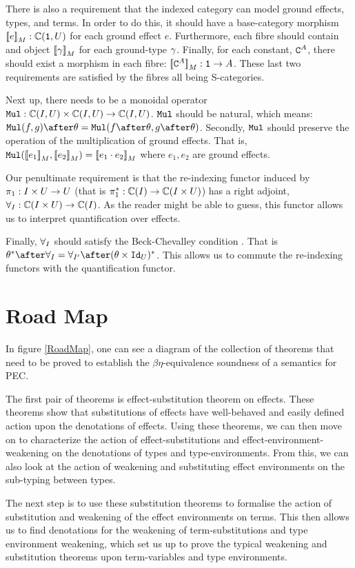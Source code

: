 \documentclass{Report}
\begin{document}
There is also a requirement that the indexed category can model ground effects, types, and terms. In order to do this, it should have a base-category morphism ${\bf [\![}e{\bf ]\!]}_M: \mathbb{C}(\texttt{1}, U)$ for each ground effect $e$. Furthermore, each fibre should contain and object ${\bf [\![}\gamma{\bf ]\!]}_M$ for each ground-type $\gamma$. Finally, for each constant, $\texttt{C}^{A}$, there should exist a morphism in each fibre: ${\bf [\![}\texttt{C}^{A}{\bf ]\!]}_M: \texttt{1} \rightarrow A$. These last two requirements are satisfied by the fibres all being S-categories.

Next up, there needs to be a monoidal operator $\texttt{Mul}: \mathbb{C}(I, U) \times \mathbb{C}(I, U) \rightarrow \mathbb{C}(I, U)$. $\texttt{Mul}$ should be natural, which means: $\Mul(f, g)\after\theta = \Mul(f\after\theta, g\after\theta)$. Secondly, $\texttt{Mul}$ should preserve the operation of the multiplication of ground effects. That is, $\texttt{Mul}({\bf [\![}e_1{\bf ]\!]}_M,{\bf [\![}e_2{\bf ]\!]}_M) = {\bf [\![}e_1\cdot e_2{\bf ]\!]}_M$ where $e_1, e_2$ are ground effects.

Our penultimate requirement is that the re-indexing functor  induced by $\pi_1: I\times U\rightarrow U$ (that is $\pi_1^*: \mathbb{C}(I) \rightarrow \mathbb{C}(I\times U)$) has a right adjoint, $\forall_I: \mathbb{C}(I\times U) \rightarrow \mathbb{C}(I)$. As the reader might be able to guess, this functor allows us to interpret quantification over effects.

Finally, $\forall_I$ should satisfy the Beck-Chevalley condition . That is $\theta\star\after\allI = \allII\after(\theta\times\Id{U})\star$. This allows us to commute the re-indexing functors with the quantification functor.

\section{Road Map}
In figure \ref{RoadMap}, one can see a diagram of the collection of theorems that need to be proved to establish the $\beta\eta$-equivalence soundness of a semantics for PEC.


The first pair of theorems is effect-substitution theorem on effects. These theorems show that substitutions of effects have well-behaved and easily defined action upon the denotations of effects. Using these theorems, we can then move on to characterize the action of effect-substitutions and effect-environment-weakening on the denotations of types and type-environments. From this, we can also look at the action of weakening and substituting effect environments on the sub-typing between types.

The next step is to use these substitution theorems to formalise the action of substitution and weakening of the effect environments on terms. This then allows us to find denotations for the weakening of term-substitutions and type environment weakening, which set us up to prove the typical weakening and substitution theorems upon term-variables and type environments. 
\end{document}
